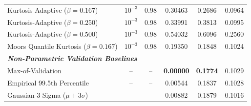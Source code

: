 \begin{table}[t]
\begin{tabular}{@{}l cccc c@{}}
Kurtosis-Adaptive ($\beta=0.167$)           & $10^{-3}$ & 0.98 & 0.30463 & 0.2686 & 0.0964 \\
Kurtosis-Adaptive ($\beta=0.250$)           & $10^{-3}$ & 0.98 & 0.33991 & 0.3813 & 0.0995 \\
Kurtosis-Adaptive ($\beta=0.500$)           & $10^{-3}$ & 0.98 & 0.54032 & 0.6096 & 0.2560 \\
Moors Quantile Kurtosis ($\beta=0.167$)     & $10^{-3}$ & 0.98 & 0.19350 & 0.1848 & 0.1024 \\
\midrule
\multicolumn{6}{l}{\textit{\textbf{Non-Parametric Validation Baselines}}} \\
Max-of-Validation                           & --        & --   & \textbf{0.00000} & \textbf{0.1774} & 0.1029 \\
Empirical 99.5th Percentile                 & --        & --   & 0.00544 & 0.1837 & 0.1028 \\
Gaussian 3-Sigma ($\mu + 3\sigma$)          & --        & --   & 0.00882 & 0.1879 & 0.1016 \\
\bottomrule
\end{tabular}
\end{table}
